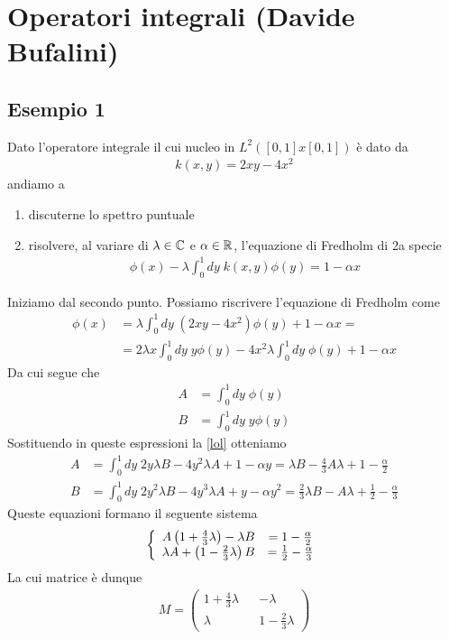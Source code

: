 \newpage

\section{Operatori integrali (Davide Bufalini)}

\subsection{Esempio 1}

Dato l'operatore integrale il cui nucleo in $L^2([0,1]x[0,1])$ è dato da
\begin{align}
	k(x,y) = 2xy-4x^2
\end{align}
andiamo a
\begin{enumerate}
	\item discuterne lo spettro puntuale
	\item risolvere, al variare di $\lambda \in \mathbb{C}$ e $\alpha \in \mathbb{R}$, l'equazione di Fredholm di 2a specie
	\begin{align}
		\phi(x) -\lambda \int_{0}^{1} dy \; k(x,y) \phi(y) = 1 -\alpha x
	\end{align} 
\end{enumerate}

Iniziamo dal secondo punto. Possiamo riscrivere l'equazione di Fredholm come
\begin{align}
	\phi(x) &= \lambda \int_{0}^{1} dy \; (2xy-4x^2) \phi(y) + 1 -\alpha x = \nonumber\\
	&= 2\lambda x \int_{0}^{1} dy \; y\phi(y) - 4x^2 \lambda \int_{0}^{1} dy \; \phi(y) + 1 -\alpha x \label{lol}
\end{align}
Da cui segue che
\begin{align}
	A &= \int_{0}^{1} dy \; \phi(y) \\
	B &= \int_{0}^{1} dy \; y\phi(y)
\end{align}
Sostituendo in queste espressioni la \ref{lol} otteniamo
\begin{align}
	A &= \int_{0}^{1} dy \; 2y\lambda B - 4y^2 \lambda A + 1 -\alpha y = \lambda B - \frac{4}{3} A \lambda +1 - \frac{\alpha}{2}\\
	B &= \int_{0}^{1} dy \; 2y^2\lambda B - 4y^3 \lambda A + y -\alpha y^2 = \frac{2}{3}\lambda B - A \lambda +\frac{1}{2} - \frac{\alpha}{3}
\end{align}
Queste equazioni formano il seguente sistema
\begin{align}
	\left\{ \begin{array}{cc} A\left(1+\frac{4}{3} \lambda\right) -\lambda B &= 1 -\frac{\alpha}{2}\\ \lambda A + \left(1 - \frac{2}{3} \lambda \right)B &= \frac{1}{2} - \frac{\alpha}{3} \end{array} \right.
\end{align}
La cui matrice è dunque
\begin{align}
	M = \begin{pmatrix}
		1+\frac{4}{3} \lambda && - \lambda \\
		\lambda && 1-\frac{2}{3} \lambda
	\end{pmatrix}
\end{align}

